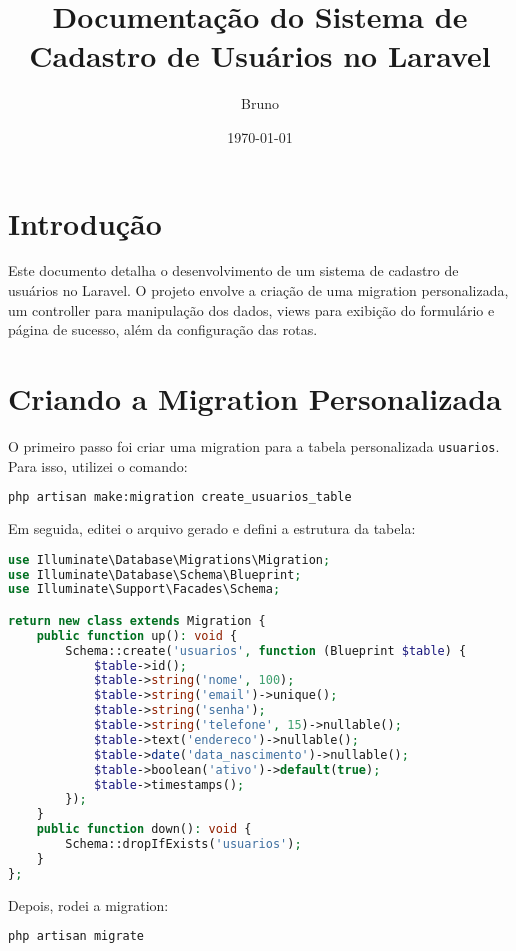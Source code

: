 \documentclass{article}
\title{Documentação do Sistema de Cadastro de Usuários no Laravel}
\author{Bruno}
\date{\today}
\begin{document}
\maketitle

\section{Introdução}
Este documento detalha o desenvolvimento de um sistema de cadastro de usuários no Laravel. O projeto envolve a criação de uma migration personalizada, um controller para manipulação dos dados, views para exibição do formulário e página de sucesso, além da configuração das rotas.

\section{Criando a Migration Personalizada}
O primeiro passo foi criar uma migration para a tabela personalizada \texttt{usuarios}. Para isso, utilizei o comando:

\begin{lstlisting}[language=bash]
php artisan make:migration create_usuarios_table
\end{lstlisting}

Em seguida, editei o arquivo gerado e defini a estrutura da tabela:

\begin{lstlisting}[language=PHP]
use Illuminate\Database\Migrations\Migration;
use Illuminate\Database\Schema\Blueprint;
use Illuminate\Support\Facades\Schema;

return new class extends Migration {
    public function up(): void {
        Schema::create('usuarios', function (Blueprint $table) {
            $table->id();
            $table->string('nome', 100);
            $table->string('email')->unique();
            $table->string('senha');
            $table->string('telefone', 15)->nullable();
            $table->text('endereco')->nullable();
            $table->date('data_nascimento')->nullable();
            $table->boolean('ativo')->default(true);
            $table->timestamps();
        });
    }
    public function down(): void {
        Schema::dropIfExists('usuarios');
    }
};
\end{lstlisting}

Depois, rodei a migration:

\begin{lstlisting}[language=bash]
php artisan migrate
\end{lstlisting}
\end{document}
